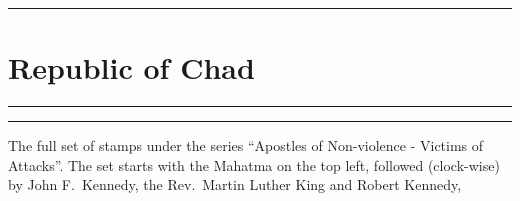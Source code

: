 \documentclass[a4paper]{article}
\begin{document}
  \hrule
\section*{Republic of Chad}
\vspace{8pt}
\hrule
\vspace{17cm}
\begin{center}
\begin{minipage}{10cm}
  \hrule \vspace{12pt} The full set of stamps under the series
  ``Apostles of Non-violence - Victims of Attacks''. The set starts
  with the Mahatma on the top left, followed (clock-wise) by John
  F.\ Kennedy, the Rev.\ Martin Luther King and Robert Kennedy,
\end{minipage}
\end{center}

\end{document}
